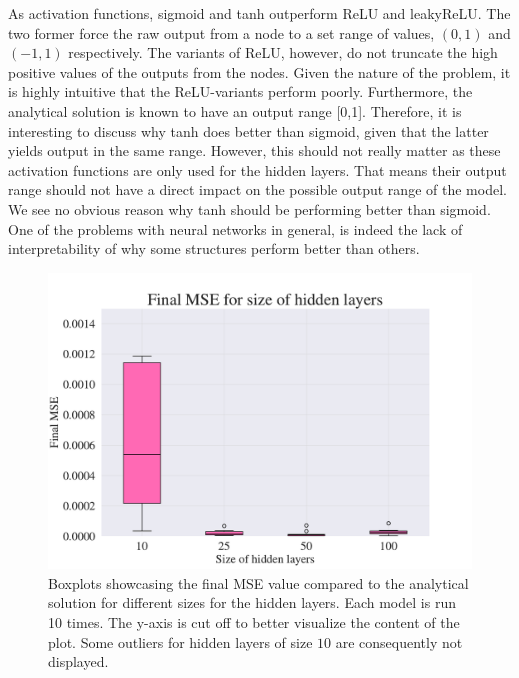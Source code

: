 
As activation functions, sigmoid and tanh outperform ReLU and leakyReLU. 
The two former force the raw output from a node to a set range of values, $(0,1)$ and $(-1,1)$ respectively. 
The variants of ReLU, however, do not truncate the high positive values of the outputs from the nodes. 
Given the nature of the problem, it is highly intuitive that the ReLU-variants perform poorly. 
Furthermore, the analytical solution is known to have an output range [0,1]. 
Therefore, it is interesting to discuss why tanh does better than sigmoid, given that the latter yields output in the same range. 
However, this should not really matter as these activation functions are only used for the hidden layers.
That means their output range should not have a direct impact on the possible output range of the model.
We see no obvious reason why tanh should be performing better than sigmoid.
One of the problems with neural networks in general, is indeed the lack of interpretability of why some structures perform better than others.


\begin{figure}[h!]
    \centering
    \includegraphics[width=1.0\linewidth]{project_3/plots/value_layers_search.pdf}
    \caption{Boxplots showcasing the final MSE value compared to the analytical solution for different sizes for the hidden layers. Each model is run 10 times. The y-axis is cut off to better visualize the content of the plot. Some outliers for hidden layers of size $10$ are consequently not displayed.}
    \label{fig:boxplots_size_of_layers}
\end{figure}

